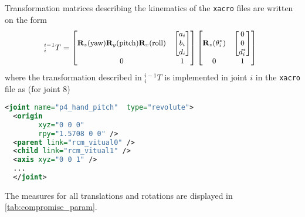 Transformation matrices describing the kinematics of the \texttt{xacro} files are written on the form
\begin{equation}
\hspace*{-2mm}
\small
^{i-1}_i T =
\begin{bmatrix}
\textbf{R}_z(\text{yaw})\textbf{R}_y(\text{pitch})\textbf{R}_x(\text{roll}) & \begin{bmatrix}a_i\\ b_i\\ d_i\end{bmatrix}\\
0 & 1
\end{bmatrix}
\begin{bmatrix}
\textbf{R}_z(\theta_i^*) & \begin{bmatrix}0\\ 0\\ d_i^* \end{bmatrix}\\
0 & 1
\end{bmatrix}
\label{eq:xacro_transformation}
\end{equation}
where the transformation described in $^{i-1}_i T$ is implemented in joint $i$ in the \texttt{xacro} file  as (for joint 8)
\begin{lstlisting}[language=xml]
  <joint name="p4_hand_pitch"  type="revolute">
  <origin
  		xyz="0 0 0"
  		rpy="1.5708 0 0" />
  <parent link="rcm_vitual0" />
  <child link="rcm_vitual1" />
  <axis xyz="0 0 1" />
  ...
  </joint>
\end{lstlisting}
The measures for all translations and rotations are displayed in \autoref{tab:compromise_param}.

